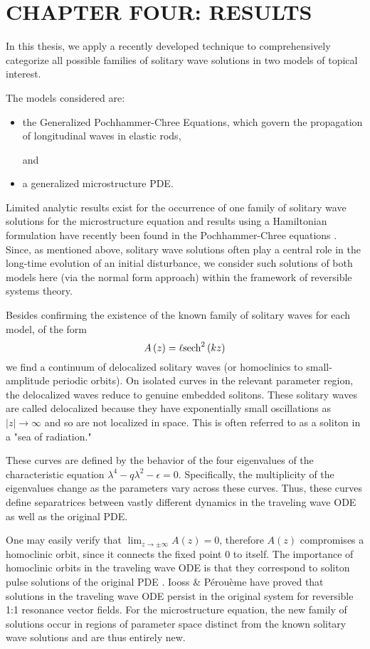\chapter{CHAPTER FOUR: RESULTS} \label{chapter_4}

In this thesis, we apply a recently developed technique to
comprehensively categorize all possible families of solitary wave
solutions in two models of topical interest.

The models considered are:
\begin{itemize}
\item the Generalized Pochhammer-Chree Equations, which  govern the propagation of longitudinal waves in elastic rods,

and

\item a generalized microstructure PDE.
\end{itemize}

Limited analytic results exist for the occurrence of one family of  solitary
wave solutions for the microstructure equation and results using a Hamiltonian
formulation have recently been found in the Pochhammer-Chree equations \cite{LiZhang}. Since, as
mentioned above, solitary wave solutions often play a central role in the
long-time evolution of an initial disturbance, we consider such solutions of
both models here (via the normal form approach) within the framework of
reversible systems theory.

Besides confirming the existence of the known family of solitary waves for each
model, of the form
\begin{equation} 
A\left(z\right) = \ell \space \mathrm{sech}^2\left(k z\right)
\end{equation}
we find a continuum of delocalized solitary waves (or homoclinics to
small-amplitude periodic orbits).  On isolated curves in the relevant parameter
region, the delocalized waves reduce to genuine embedded solitons. 
These solitary waves are called delocalized because they have exponentially
small oscillations as $|z|\rightarrow\infty$ and so are not localized in space.
This is often referred to as a soliton in a "sea of radiation."

These curves are defined by the behavior of the four eigenvalues of the characteristic
equation $ \lambda^4 - q \lambda^2 - \epsilon =  0$. Specifically, the 
multiplicity of the eigenvalues change as the parameters vary across these curves.
Thus, these curves define separatrices between vastly different dynamics in 
the traveling wave ODE as well as the original PDE.

One may easily verify that $\lim_{z\rightarrow\pm\infty} A(z) = 0$, therefore
$A(z)$ compromises a homoclinic orbit, since it connects the fixed point $0$ to
itself. The importance of homoclinic orbits in the traveling wave ODE is that
they correspond to soliton pulse solutions of the original PDE \cite{IA}. Iooss
\& P\'erou\`eme have proved that solutions in the traveling wave ODE persist in
the original system \cite{IP} for reversible 1:1 resonance vector fields.  For
the microstructure equation, the new family of solutions occur in regions of
parameter space distinct from the known solitary wave solutions and are thus
entirely new. 

